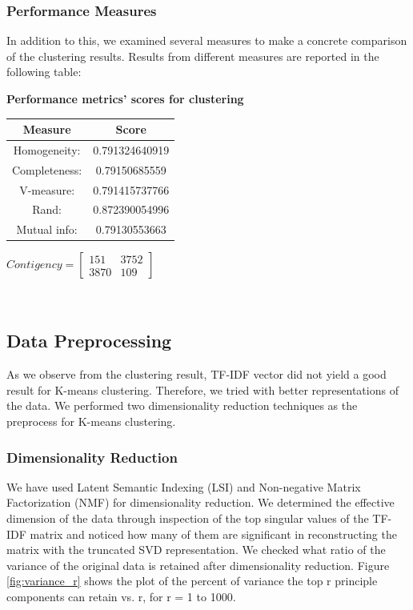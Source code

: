 \documentclass{report}
\begin{document}
\subsubsection*{Performance Measures}
In addition to this, we examined several measures to make a concrete comparison of the clustering results. Results from different measures are reported in the following table: 

\begin{center}
	\textbf{Performance metrics' scores for clustering}	
	\begin{tabular}{*{2}{c}}
		\toprule
		\textbf{Measure} & \textbf{Score}  \\
		\midrule
		Homogeneity: & 0.791324640919  \\
		\midrule
		Completeness: & 0.79150685559   \\
		\midrule
		V-measure: & 0.791415737766   \\
		\midrule
		Rand: & 0.872390054996   \\
		\midrule
		Mutual info: & 0.79130553663  \\
		\bottomrule
	\end{tabular}
	\qquad
	$Contigency = \left[\begin{array}{*{2}{c}}
    				151 & 3752 \\
     				3870 & 109
					\end{array}\right]
					$
\end{center}    

\\  \vspace{20pt}



\subsection*{Data Preprocessing}
As we observe from the clustering result, TF\--IDF vector did not yield a good result for K-means clustering. Therefore, we tried with better representations of the data. We performed two dimensionality reduction techniques as the preprocess for K-means clustering. \\ \vspace{10pt}


\subsubsection{Dimensionality Reduction}
We have used Latent Semantic Indexing (LSI) and Non-negative Matrix Factorization (NMF) for dimensionality reduction. 
We determined the effective dimension of the data through inspection of the top singular values of the TF\--IDF matrix and noticed how many of them are significant in reconstructing the matrix with the truncated SVD representation. We checked what ratio of the variance of the original data is retained after dimensionality reduction. Figure \ref{fig:variance_r} shows the plot of the percent of variance the top r principle components can retain vs. r, for r = 1 to 1000.
\end{document}
